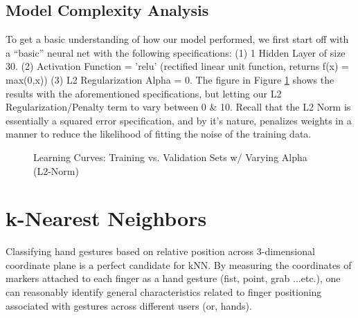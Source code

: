 \documentclass[letterpaper,12pt]{article}
\begin{document}
\subsection{Model Complexity Analysis}
To get a basic understanding of how our model performed, we first start off with a ``basic'' neural net with the following specifications:  (1) 1 Hidden Layer of size 30.  (2) Activation Function = 'relu' (rectified linear unit function, returns f(x) = max(0,x)) (3) L2 Regularization Alpha = 0.  The figure in Figure \ref{fig:ANN Learning Curves} shows the results with the aforementioned specifications, but letting our L2 Regularization/Penalty term to vary between 0 \& 10.
Recall that the L2 Norm is essentially a squared error specification, and by it's nature, penalizes weights in a manner to reduce the likelihood of fitting the noise of the training data.  

\begin{figure} %
  \centering
  \hspace{8pt}%
  \caption{Learning Curves:  Training vs. Validation Sets w/ Varying Alpha (L2-Norm)}\label{fig:ANN Learning Curves}
\end{figure}

\section{k-Nearest Neighbors}
Classifying hand gestures based on relative position across 3-dimensional coordinate plane is a perfect candidate for kNN.  By measuring the coordinates of markers attached to each finger as a hand gesture (fist, point, grab ...etc.), one can reasonably identify general characteristics related to finger positioning associated with gestures across different users (or, hands).
\end{document}
